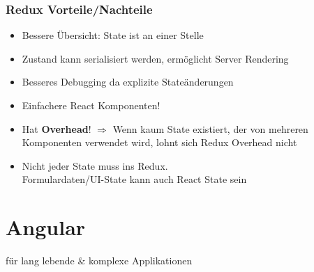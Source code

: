 \begin{multicols*}{4}
%

\subsubsection{Redux Vorteile/Nachteile}
\begin{itemize}
    \item Bessere Übersicht: State ist an einer Stelle
    \item Zustand kann serialisiert werden, ermöglicht Server Rendering
    \item Besseres Debugging da explizite Stateänderungen
    \item Einfachere React Komponenten!
    \item Hat \textbf{Overhead}! \(\Rightarrow\) Wenn kaum State existiert, der von mehreren Komponenten verwendet wird, lohnt sich Redux Overhead nicht
    \item Nicht jeder State muss ins Redux.\\Formulardaten/UI-State kann auch React State sein
\end{itemize}

\section{Angular}
für lang lebende \& komplexe Applikationen


\end{multicols*}

